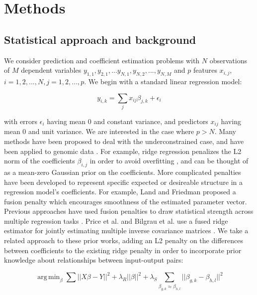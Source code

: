 \documentclass[11pt]{article}
\DeclareMathOperator*{\argmin}{arg\,min}
\begin{document}
\section{Methods}

\subsection{Statistical approach and background}
We consider prediction and coefficient estimation problems with $N$ observations of $M$ dependent variables $y_{1,1}, y_{2,1}, ...y_{N,1}, y_{N,2},..., y_{N, M}$ and $p$ features $x_{i,j}$, $i=1,2,...,N, j=1,2,...,p$. We begin with a standard linear regression model:

\begin{equation}
y_{i,k} = \displaystyle\sum_{j}x_{ij}\beta_{j,k} + \epsilon_i
\end{equation}

with errors $\epsilon_i$ having mean 0 and constant variance, and predictors $x_{ij}$ having mean 0 and unit variance. We are interested in the case where $p > N$. Many methods have been proposed to deal with the underconstrained case, and have been applied to genomic data \cite{waldron_optimized_2011, li_network-constrained_2008}. For example, ridge regression penalizes the L2 norm of the coefficients $\beta_{i,j}$ in order to avoid overfitting \cite{hoerl_ridge_1970}, and can be thought of as a mean-zero Gaussian prior on the coefficients. 
More complicated penalties have been developed to represent specific expected or desireable structure in a regression model's coefficients. 
For example, Land and Friedman \cite{citeulike3780356} proposed a fusion penalty which encourages smoothness of the estimated parameter vector. Previous approaches have used  fusion penalties to draw statistical strength across multiple regression tasks \cite{kim_tree-guided_2012,Land1997,Chen2010,Petry2011,Hebiri2011}. 
Price et al. and Bilgrau et al. use a fused ridge estimator for jointly estimating multiple inverse covariance matrices \cite{Price2014a,Bilgrau2015}.
We take a related approach to these prior works, adding an L2 penalty on the differences between coefficients to the existing ridge penalty in order to incorporate prior knowledge about relationships between input-output pairs:

\begin{equation}
\argmin_{\beta} \displaystyle\sum \vert \vert X\beta - Y \vert \vert ^2 + \lambda_R \vert \vert \beta \vert \vert ^2 +  \lambda_S  \displaystyle \sum_{\beta_{g,k} \approx \beta_{h,l}} || \beta_{g,k} - \beta_{h,l} ||^2
\label{eqn:main}
\end{equation}
\end{document}

